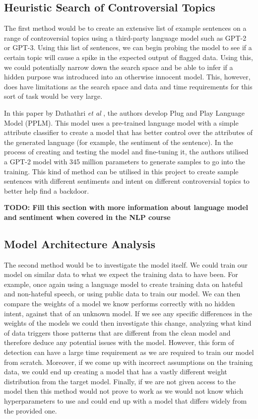 \subsection{Heuristic Search of Controversial Topics}

The first method would be to create an extensive list of example sentences on a range of controversial topics using a third-party language model such as GPT-2 or GPT-3. Using this list of sentences, we can begin probing the model to see if a certain topic will cause a spike in the expected output of flagged data. Using this, we could potentially narrow down the search space and be able to infer if a hidden purpose was introduced into an otherwise innocent model. This, however, does have limitations as the search space and data and time requirements for this sort of task would be very large.

In this paper by Dathathri \textit{et al} \cite{PlugNPlay}, the authors develop Plug and Play Language Model (PPLM). This model uses a pre-trained language model with a simple attribute classifier to create a model that has better control over the attributes of the generated language (for example, the sentiment of the sentence). In the process of creating and testing the model and fine-tuning it, the authors utilised a GPT-2 model with 345 million parameters \cite{GPT} to generate samples to go into the training. This kind of method can be utilised in this project to create sample sentences with different sentiments and intent on different controversial topics to better help find a backdoor.

\textbf{TODO: Fill this section with more information about language model and sentiment when covered in the NLP course}

\subsection{Model Architecture Analysis}

The second method would be to investigate the model itself. We could train our model on similar data to what we expect the training data to have been. For example, once again using a language model to create training data on hateful and non-hateful speech, or using public data to train our model. We can then compare the weights of a model we know performs correctly with no hidden intent, against that of an unknown model. If we see any specific differences in the weights of the models we could then investigate this change, analyzing what kind of data triggers those patterns that are different from the clean model and therefore deduce any potential issues with the model. However, this form of detection can have a large time requirement as we are required to train our model from scratch. Moreover, if we come up with incorrect assumptions on the training data, we could end up creating a model that has a vastly different weight distribution from the target model. Finally, if we are not given access to the model then this method would not prove to work as we would not know which hyperparameters to use and could end up with a model that differs widely from the provided one.

